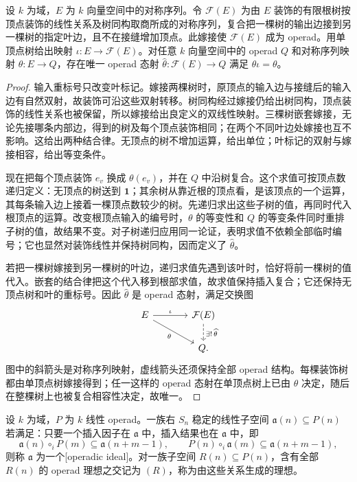 \begin{theorem}\label{b4:thm:free-operad}
	设 \(k\) 为域，\(E\) 为 \(k\) 向量空间中的对称序列。令 \(\mathcal F(E)\) 为由 \(E\) 装饰的有限根树按顶点装饰的线性关系及树同构取商所成的对称序列，复合把一棵树的输出边接到另一棵树的指定叶边，且不在接缝增加顶点。此嫁接使 \(\mathcal F(E)\) 成为 operad。用单顶点树给出映射 \(\iota:E\rightarrow\mathcal F(E)\)。对任意 \(k\) 向量空间中的 operad \(Q\) 和对称序列映射 \(\theta:E\rightarrow Q\)，存在唯一 operad 态射 \(\widehat\theta:\mathcal F(E)\rightarrow Q\) 满足 \(\widehat\theta\iota=\theta\)。
\end{theorem}
\begin{proof}
	输入重标号只改变叶标记。嫁接两棵树时，原顶点的输入边与接缝后的输入边有自然双射，故装饰可沿这些双射转移。树同构经过嫁接仍给出树同构，顶点装饰的线性关系也被保留，所以嫁接给出良定义的双线性映射。三棵树嵌套嫁接，无论先接哪条内部边，得到的树及每个顶点装饰相同；在两个不同叶边处嫁接也互不影响。这给出两种结合律。无顶点的树不增加运算，给出单位；叶标记的双射与嫁接相容，给出等变条件。

	现在把每个顶点装饰 \(e_v\) 换成 \(\theta(e_v)\)，并在 \(Q\) 中沿树复合。这个求值可按顶点数递归定义：无顶点的树送到 \(\mathbf1\)；其余树从靠近根的顶点看，是该顶点的一个运算，其每条输入边上接着一棵顶点数较少的树。先递归求出这些子树的值，再同时代入根顶点的运算。改变根顶点输入的编号时，\(\theta\) 的等变性和 \(Q\) 的等变条件同时重排子树的值，故结果不变。对子树递归应用同一论证，表明求值不依赖全部临时编号；它也显然对装饰线性并保持树同构，因而定义了 \(\widehat\theta\)。

	若把一棵树嫁接到另一棵树的叶边，递归求值先遇到该叶时，恰好将前一棵树的值代入。嵌套的结合律把这个代入移到根部求值，故求值保持插入复合；它还保持无顶点树和叶的重标号。因此 \(\widehat\theta\) 是 operad 态射，满足交换图
	\[
		\begin{tikzcd}[column sep=large]
			E\arrow[r,"\iota"]\arrow[dr,"\theta"']&\mathcal F(E)\arrow[d,dashed,"\exists!\,\widehat\theta"]\\
			&Q.
		\end{tikzcd}
	\]
	图中的斜箭头是对称序列映射，虚线箭头还须保持全部 operad 结构。每棵装饰树都由单顶点树嫁接得到；任一这样的 operad 态射在单顶点树上已由 \(\theta\) 决定，随后在整棵树上也被复合相容性决定，故唯一。
\end{proof}

\begin{definition}\label{b4:def:operad-ideal}
	设 \(k\) 为域，\(P\) 为 \(k\) 线性 operad。一族右 \(S_n\) 稳定的线性子空间 \(\mathfrak a(n)\subseteq P(n)\) 若满足：只要一个插入因子在 \(\mathfrak a\) 中，插入结果也在 \(\mathfrak a\) 中，即
	\[
		\mathfrak a(n)\circ_i P(m)\subseteq\mathfrak a(n+m-1),
		\qquad P(n)\circ_i\mathfrak a(m)\subseteq\mathfrak a(n+m-1),
	\]
	则称 \(\mathfrak a\) 为一个[operadic ideal]。对一族子空间 \(R(n)\subseteq P(n)\)，含有全部 \(R(n)\) 的 operad 理想之交记为 \((R)\)，称为由这些关系生成的理想。
\end{definition}

